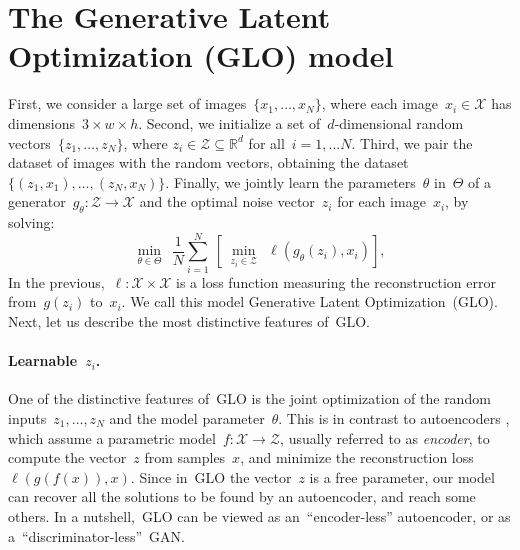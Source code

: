\documentclass{article}
\newcommand{\GNAT}{GLO}
\begin{document}
\section{The Generative Latent Optimization (\GNAT{}) model}\label{sec:gnat}

First, we consider a large set of images~$\{ x_1, \ldots, x_N \}$, where each
image~$x_i \in \mathcal{X}$ has dimensions~$3 \times w \times h$.  Second, we
initialize a set of~$d$-dimensional random vectors~$\{ z_1, \ldots, z_N \}$,
where $z_i \in \mathcal{Z} \subseteq \mathbb{R}^d$ for all~$i =1, \ldots N$.
Third, we pair the dataset of images with the random vectors, obtaining the
dataset~$\{(z_1, x_1), \ldots, (z_N, x_N) \}$.  Finally, we jointly learn the
parameters~$\theta$ in~$\Theta$ of a generator~$g_\theta : \mathcal{Z} \to
\mathcal{X}$ and the optimal noise vector~$z_i$ for each image~$x_i$, by
solving:
\begin{equation}
  \label{eq:nai}
  \min_{\theta\in\Theta}~~\frac{1}{N}\sum_{i=1}^N~\left[~\min_{z_i \in\mathcal{Z}}~~\ell\left(g_\theta(z_i),x_i\right)\right],
\end{equation}
In the previous,~$\ell : \mathcal{X} \times \mathcal{X}$ is a loss function
measuring the reconstruction error from~$g(z_i)$ to~$x_i$.  We call this model
Generative Latent Optimization~(\GNAT{}). Next, let us describe the most
distinctive features of~\GNAT{}.

\paragraph{Learnable~$z_i$.} One of the distinctive features of~\GNAT{} is the joint
optimization of the random inputs~$z_1, \ldots, z_N$ and the model parameter~$\theta$.
This is in contrast to autoencoders \citep{boulard_ae}, which assume a parametric model~$f :
\mathcal{X} \to \mathcal{Z}$, usually referred to as \emph{encoder}, to compute
the vector~$z$ from samples~$x$, and minimize the reconstruction loss~$\ell(g(f(x)),x)$.
Since in~\GNAT{} the vector~$z$ is a free
parameter, our model can recover all the solutions to be found by an
autoencoder, and reach some others. In a nutshell,~\GNAT{} can be
viewed as an~``encoder-less'' autoencoder, or as a~``discriminator-less''~GAN.
\end{document}
